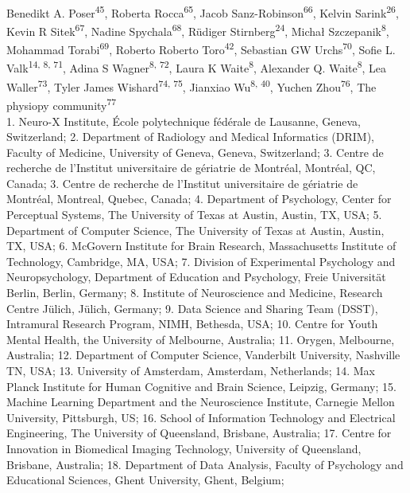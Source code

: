 \documentclass[10pt,a4paper,twocolumns]{proc}
\newcommand{\affiliations}[1]{{\scriptsize #1} \\}
\begin{document}
{Benedikt A. Poser\textsuperscript{45}, %
Roberta Rocca\textsuperscript{65}, %
Jacob Sanz-Robinson\textsuperscript{66}, %
Kelvin Sarink\textsuperscript{26}, %
Kevin R Sitek\textsuperscript{67}, %
Nadine Spychala\textsuperscript{68}, %
Rüdiger Stirnberg\textsuperscript{24}, %
Michał Szczepanik\textsuperscript{8}, %
Mohammad Torabi\textsuperscript{69}, %
Roberto Roberto Toro\textsuperscript{42}, %
Sebastian GW Urchs\textsuperscript{70}, %
Sofie L. Valk\textsuperscript{14, 8, 71}, %
Adina S Wagner\textsuperscript{8, 72}, %
Laura K Waite\textsuperscript{8}, %
Alexander Q. Waite\textsuperscript{8}, %
Lea Waller\textsuperscript{73}, %
Tyler James Wishard\textsuperscript{74, 75}, %
Jianxiao Wu\textsuperscript{8, 40}, %
Yuchen Zhou\textsuperscript{76}, %
The physiopy community\textsuperscript{77} %
}
\\
\affiliations{1. Neuro-X Institute, École polytechnique fédérale de Lausanne, Geneva, Switzerland; %
2. Department of Radiology and Medical Informatics (DRIM), Faculty of Medicine, University of Geneva, Geneva, Switzerland; %
3. Centre de recherche de l'Institut universitaire de gériatrie de Montréal, Montréal, QC, Canada; %
3. Centre de recherche de l'Institut universitaire de gériatrie de Montréal, Montreal, Quebec, Canada; %
4. Department of Psychology, Center for Perceptual Systems, The University of Texas at Austin, Austin, TX, USA; %
5. Department of Computer Science, The University of Texas at Austin, Austin, TX, USA; %
6. McGovern Institute for Brain Research, Massachusetts Institute of Technology, Cambridge, MA, USA; %
7. Division of Experimental Psychology and Neuropsychology, Department of Education and Psychology, Freie Universität Berlin, Berlin, Germany; %
8. Institute of Neuroscience and Medicine, Research Centre Jülich, Jülich, Germany; %
9. Data Science and Sharing Team (DSST), Intramural Research Program, NIMH, Bethesda, USA; %
10. Centre for Youth Mental Health, the University of Melbourne, Australia; %
11. Orygen, Melbourne, Australia; %
12. Department of Computer Science, Vanderbilt University, Nashville TN, USA; %
13. University of Amsterdam, Amsterdam, Netherlands; %
14. Max Planck Institute for Human Cognitive and Brain Science, Leipzig, Germany; %
15. Machine Learning Department and the Neuroscience Institute, Carnegie Mellon University, Pittsburgh, US; %
16. School of Information Technology and Electrical Engineering, The University of Queensland, Brisbane, Australia; %
17. Centre for Innovation in Biomedical Imaging Technology, University of Queensland, Brisbane, Australia; %
18. Department of Data Analysis, Faculty of Psychology and Educational Sciences, Ghent University, Ghent, Belgium; %
}
\end{document}
